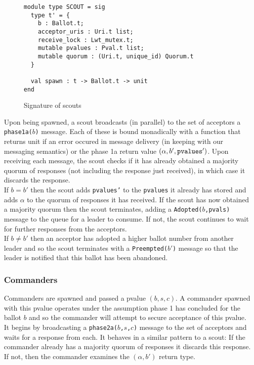 \begin{figure}
  \begin{lstlisting}
module type SCOUT = sig
  type t' = {
    b : Ballot.t;
    acceptor_uris : Uri.t list;
    receive_lock : Lwt_mutex.t;  
    mutable pvalues : Pval.t list;
    mutable quorum : (Uri.t, unique_id) Quorum.t
  }

  val spawn : t -> Ballot.t -> unit
end
  \end{lstlisting}
  \centering
  \caption{Signature of scouts}
  \label{fig:scout-sig}
\end{figure}

Upon being spawned, a scout broadcasts (in parallel) to the set of acceptors a \texttt{phase1a($b$)} message. Each of these is bound monadically with a function that returns unit if an error occured in message delivery (in keeping with our messaging semantics) or the phase 1a return value $(\alpha, b', \textrm{\texttt{pvalues}}')$. Upon receiving each message, the scout checks if it has already obtained a majority quorum of responses (not including the response just received), in which case it discards the response. \\

If $b = b'$ then the scout adds \texttt{pvalues'} to the \texttt{pvalues} it already has stored and adds $\alpha$ to the quorum of responses it has received. If the scout has now obtained a majority quorum then the scout terminates, adding a \texttt{Adopted($b$,pvals)} message to the queue for a leader to consume. If not, the scout continues to wait for further responses from the acceptors. \\

If $b \neq b'$ then an acceptor has adopted a higher ballot number from another leader and so the scout terminates with a \texttt{Preempted($b'$)} message so that the leader is notified that this ballot has been abandoned. \\

\subsubsection{Commanders}

Commanders are spawned and passed a pvalue $\left(b, s, c \right)$. A commander spawned with this pvalue operates under the assumption phase 1 has concluded for the ballot $b$ and so the commander will attempt to secure acceptance of this pvalue. \\

It begins by broadcasting a \texttt{phase2a($b$,$s$,$c$)} message to the set of acceptors and waits for a response from each. It behaves in a similar pattern to a scout: If the commander already has a majority quorum of responses it discards this response. If not, then the commander examines the $\left(\alpha, b' \right)$ return type. \\

